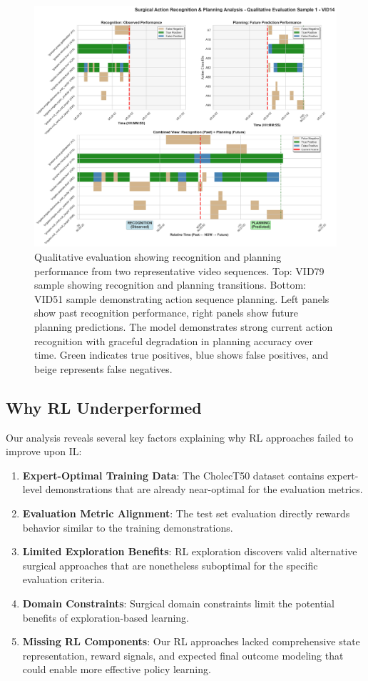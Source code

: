 \documentclass[runningheads]{llncs}
\begin{document}
\begin{figure}[h]
\centering
\includegraphics[width=\textwidth]{VID14_preds_sample_1.png}
\caption{Qualitative evaluation showing recognition and planning performance from two representative video sequences. Top: VID79 sample showing recognition and planning transitions. Bottom: VID51 sample demonstrating action sequence planning. Left panels show past recognition performance, right panels show future planning predictions. The model demonstrates strong current action recognition with graceful degradation in planning accuracy over time. Green indicates true positives, blue shows false positives, and beige represents false negatives.}
\label{fig:qualitative_examples}
\end{figure}

\subsection{Why RL Underperformed}

Our analysis reveals several key factors explaining why RL approaches failed to improve upon IL:

\begin{enumerate}
\item \textbf{Expert-Optimal Training Data}: The CholecT50 dataset contains expert-level demonstrations that are already near-optimal for the evaluation metrics.
\item \textbf{Evaluation Metric Alignment}: The test set evaluation directly rewards behavior similar to the training demonstrations.
\item \textbf{Limited Exploration Benefits}: RL exploration discovers valid alternative surgical approaches that are nonetheless suboptimal for the specific evaluation criteria.
\item \textbf{Domain Constraints}: Surgical domain constraints limit the potential benefits of exploration-based learning.
\item \textbf{Missing RL Components}: Our RL approaches lacked comprehensive state representation, reward signals, and expected final outcome modeling that could enable more effective policy learning.
\end{enumerate}
\end{document}
